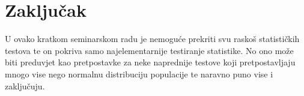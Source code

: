 \chapter{Zaključak}

U ovako kratkom seminarskom radu je nemoguće prekriti svu raskoš statističkih testova te on pokriva samo najelementarnije testiranje statistike. No ono može biti preduvjet kao pretpostavke za neke naprednije testove koji pretpostavljaju mnogo vise nego normalnu distribuciju populacije te naravno puno vise i zaključuju.